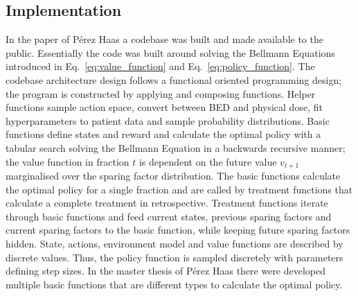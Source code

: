 \documentclass[\relativeRoot/ada.tex]{subfiles}
\begin{document}
\subsection{Implementation}

In the paper of Pérez Haas \cite{perezhaas_adaptive} a codebase was built and made available to the public.  Essentially the code was built around solving the Bellmann Equations introduced in Eq.~\ref{eq:value_function} and Eq.~\ref{eq:policy_function}. The codebase architecture design follows a functional oriented programming design; the program is constructed by applying and composing functions. Helper functions sample action space, convert between BED and physical dose, fit hyperparameters to patient data and sample probability distributions. Basic functions define states and reward and calculate the optimal policy with a tabular search solving the Bellmann Equation in a backwards recursive manner; the value function  in fraction $t$ is dependent on the future value $v_{t+1}$ marginalised over the sparing factor distribution. The basic functions calculate the optimal policy for a single fraction and are called by treatment functions that calculate a complete treatment in retrospective. Treatment functions iterate through basic functions and feed current states, previous sparing factors and current sparing factors to the basic function, while keeping future sparing factors hidden. State, actions, environment model and value functions are described by discrete values. Thus, the policy function is sampled discretely with parameters defining step sizes. In the master thesis of Pérez Haas \cite{perezhaas_master} there were developed multiple basic functions that are different types to calculate the optimal policy.
\end{document}
